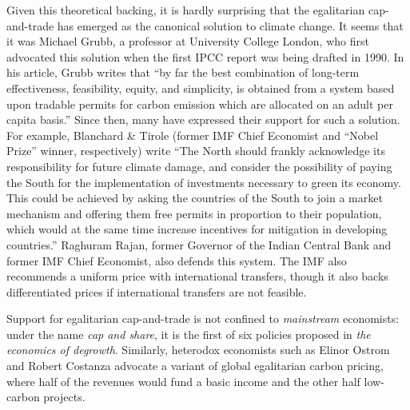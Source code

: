 \documentclass[12pt,english]{article}
\begin{document}
Given this theoretical backing, it is hardly surprising that the egalitarian cap-and-trade has emerged as the canonical solution to climate change. %
It seems that it was Michael Grubb, a professor at University College London, who first advocated this solution when the first IPCC report was being drafted in 1990.\citep{grubb_greenhouse_1990} In his article, Grubb writes that ``by far the best combination of long-term effectiveness, feasibility, equity, and simplicity, is obtained from a system based upon tradable permits for carbon emission which are allocated on an adult per capita basis.'' %
Since then, many have expressed their support for such a solution.\citep{agarwal_global_1991,bertram_tradeable_1992,baer_equity_2000,jamieson_climate_2001,van_den_bergh_dual-track_2020,cramton_global_2017} For example, Blanchard \& Tirole\citep{blanchard_major_2021} (former IMF Chief Economist and ``Nobel Prize'' winner, respectively) write ``The North should
frankly acknowledge its responsibility for future climate damage, and consider the possibility of paying the South for the implementation of investments necessary to green its economy. This could be achieved by asking the countries of the South to join a %
market mechanism and offering them free permits in proportion to their population, which would at the same time increase incentives for mitigation in developing countries.'' Raghuram Rajan, former Governor of the Indian Central Bank and former IMF Chief Economist, also defends this system.\citep{rajan_global_2021} The IMF also recommends a uniform price with international transfers, though it also backs differentiated prices if international transfers are not feasible.\citep{imf_how_2019}

Support for egalitarian cap-and-trade is not confined to \textit{mainstream} economists: under the name \textit{cap and share}, it is the first of six policies proposed in \textit{the economics of degrowth}.\citep{kallis_economics_2012} Similarly, heterodox economists such as Elinor Ostrom and Robert Costanza advocate a variant of global egalitarian carbon pricing, where half of the revenues would fund a basic income and the other half low-carbon projects.\citep{barnes_creating_2008} 
\end{document}
